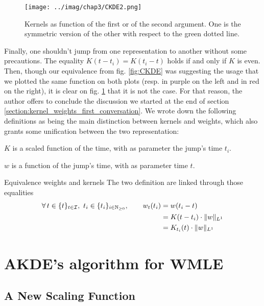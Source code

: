 \documentclass[11pt]{book}
\newcommand{\sequence}[1]{\{ #1 \}_{ i \in \N} }
\newcommand{\sequencetime}{\{t\}_{t \in \mathcal I} }
\begin{document}
\begin{figure}
\centering
\texttt{[image: ../imag/chap3/CKDE2.png]}
\caption{Kernels as function of the first or of the second argument. One is the symmetric version of the other with respect to the green dotted line.}
\label{fig:CKDE2}
\end{figure}


\newpage 
Finally, one shouldn't jump from one representation to another without some precautions. The equality $K(t - t_i) = K(t_i - t)$ holds if and only if $K$ is even. Then, though our equivalence from fig. \ref{fig:CKDE} was suggesting the usage that we plotted the same function on both plots (resp. in purple on the left and in red on the right), it is clear on fig. \ref{fig:CKDE2} that it is not the case. For that reason, the author offers to conclude the discussion we started at the end of section \ref{section:kernel_weights_first_conversation}. We wrote down the following definitions as being the main distinction between kernels and weights, which also grants some unification between the two representation:
\begin{definition}[Kernel]
$K$ is a scaled function of the time, with as parameter the jump's time $t_i$.
\end{definition}

\begin{definition}
$w$ is a function of the jump's time, with as parameter time $t$.
\end{definition}

\begin{theoreme}[label = thrm:equiv_w_k]{Equivalence weights and kernels}
The two definition are linked through those equalities
\begin{align*}
\forall t \in \sequencetime, \ t_i \in \sequence{t_i }, \qquad w_t(t_i) 
&= w(t_i - t) \\
&=  K(t - t_i) \cdot \norm{w}_{L^1} \\
&= K_{t_i}(t) \cdot \norm{w}_{L^1}
\end{align*}
\end{theoreme}





\section{AKDE's algorithm for WMLE}
\subsection{A New Scaling Function}
\end{document}
